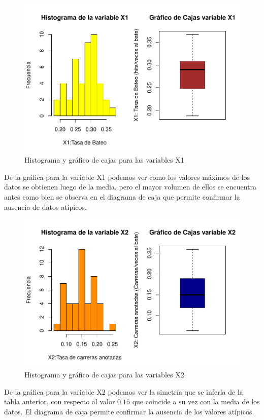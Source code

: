 \documentclass{staprojteamusb}
\begin{document}
 \begin{figure}
 \centering
 \includegraphics{Descripcion-Datos_files/figure-latex/unnamed-chunk-7-1.pdf}
 \caption{Histograma y gráfico de cajas para las variables X1}
 \end{figure}

 De la gráfica para la variable X1 podemos ver como los valores máximos
 de los datos se obtienen luego de la media, pero el mayor volumen de
 ellos se encuentra antes como bien se observa en el diagrama de caja
 que permite confirmar la ausencia de datos atípicos.

 \begin{figure}
 \centering
 \includegraphics{Descripcion-Datos_files/figure-latex/unnamed-chunk-8-1.pdf}
 \caption{Histograma y gráfico de cajas para las variables X2}
 \end{figure}

 De la gráfica para la variable X2 podemos ver la simetría que se
 infería de la tabla anterior, con respecto al valor \(0.15\) que
 coincide a su vez con la media de los datos. El diagrama de caja
 permite confirmar la ausencia de los valores atípicos.
	
	
	
	\printbibliography
	
	
	
	
\end{document}
